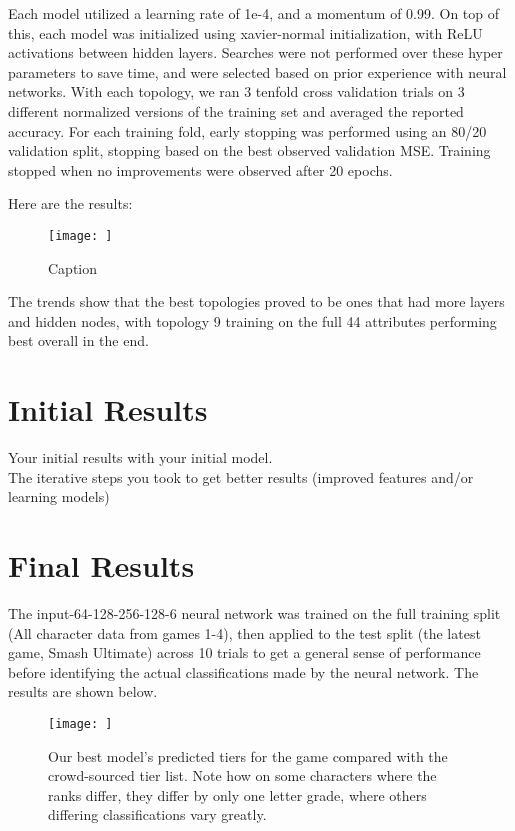 \documentclass{article}
\begin{document}
 Each model utilized a learning rate of 1e-4, and a momentum of 0.99. On top of this, each model was initialized using xavier-normal initialization, with ReLU activations between hidden layers. Searches were not performed over these hyper parameters to save time, and were selected based on prior experience with neural networks. With each topology, we ran 3 tenfold cross validation trials on 3 different normalized versions of the training set and averaged the reported accuracy. For each training fold, early stopping was performed using an 80/20 validation split, stopping based on the best observed validation MSE. Training stopped when no improvements were observed after 20 epochs.

Here are the results:

\begin{figure}[!htb]
    \centering
    \texttt{[image: ]}
    \caption{Caption}
    \label{fig:my_label}
\end{figure}

The trends show that the best topologies proved to be ones that had more layers and hidden nodes, with topology 9 training on the full 44 attributes performing best overall in the end.



\section{Initial Results}

Your initial results with your initial model.\\
The iterative steps you took to get better results (improved features and/or learning models)

\section{Final Results}

The input-64-128-256-128-6 neural network was trained on the full training split (All character data from games 1-4), then applied to the test split (the latest game, Smash Ultimate) across 10 trials to get a general sense of performance before identifying the actual classifications made by the neural network. The results are shown below.

\begin{figure}[!htb]
    \centering
    \texttt{[image: ]}
    \caption{Our best model's predicted tiers for the game compared with the crowd-sourced tier list. Note how on some characters where the ranks differ, they differ by only one letter grade, where others differing classifications vary greatly.}
    \label{fig:my_label}
\end{figure}
\end{document}
